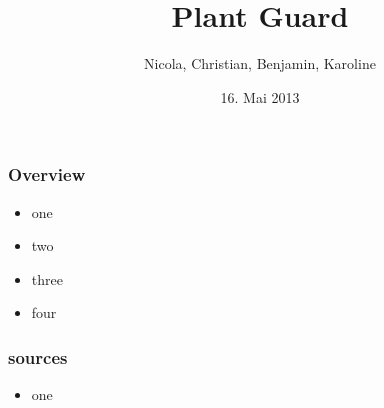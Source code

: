 \documentclass{beamer}
\title{Plant Guard}
\author{Nicola, Christian, Benjamin, Karoline}
\date{16. Mai 2013}
\begin{document}

\frame{\titlepage}

\begin{frame}
\frametitle{Overview}
    \begin{itemize}
        \item one
        \item two
        \item three
        \item four
    \end{itemize}
\end{frame}

\begin{frame}
\frametitle{sources}
    \begin{itemize}
        \item one 
    \end{itemize}
\end{frame}
\end{document}

